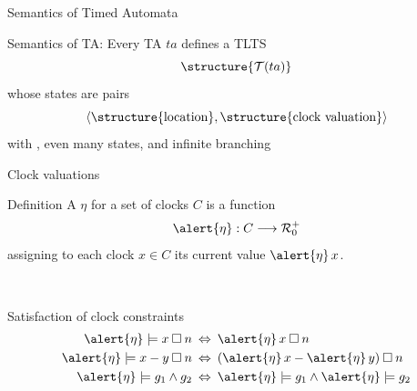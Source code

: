 \documentclass[aspectratio=169]{beamer}
\def\R{\mathcal{R}}
\def\TL#1{\mathcal{T}(#1)}
\begin{document}
\begin{slide}{Semantics of Timed Automata}
\small

\begin{block}{Semantics of TA:}
Every TA $ta$ defines a TLTS 
\begin{equation*}
\structure{\TL{ta}}
\end{equation*}
whose states are pairs 
\begin{equation*}
\pair{\structure{\text{location}}, \structure{\text{clock valuation}} }
\end{equation*}
with , even  many states, and infinite branching
\end{block}
\end{slide}

\begin{slide}{Clock valuations}
\small


\begin{block}{Definition}
A  \alert{$\eta$} for a set of clocks $C$ is a function 
\begin{equation*}
\fdec{\alert{\eta}}{C}{\R_0^+}
\end{equation*}
assigning to each clock $x \in C$ its current value $\alert{\eta}\, x$.
\end{block}
~\\

\begin{block}{Satisfaction of clock constraints}
\begin{align*}
\alert{\eta} \models x \mathbin{\square} n \; & \dimp\; \alert{\eta}\, x \mathbin{\square} n\\
\alert{\eta} \models x-y \mathbin{\square} n \; & \dimp\; (\alert{\eta}\, x - \alert{\eta}\, y) \mathbin{\square} n\\
\alert{\eta} \models g_1 \e g_2 \; & \dimp\; \alert{\eta} \models g_1 \e \alert{\eta} \models g_2
\end{align*}
\end{block}
\end{slide}
\end{document}
